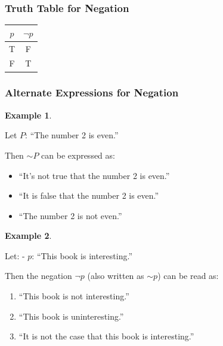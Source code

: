 \documentclass[
]{book}
\providecommand{\tightlist}{%
  \setlength{\itemsep}{0pt}\setlength{\parskip}{0pt}}
\theoremstyle{definition}
\theoremstyle{definition}
\newtheorem{example}{Example}[chapter]
\theoremstyle{definition}
\theoremstyle{definition}
\theoremstyle{remark}
\begin{document}
\subsubsection{Truth Table for Negation}\label{truth-table-for-negation}

\begin{longtable}[]{@{}cc@{}}
\toprule\noalign{}
\(p\) & \(\neg p\) \\
\midrule\noalign{}
\endhead
\bottomrule\noalign{}
\endlastfoot
T & F \\
F & T \\
\end{longtable}

\subsubsection{Alternate Expressions for Negation}\label{alternate-expressions-for-negation}

\begin{example}
\protect\hypertarget{exm:unnamed-chunk-14}{}\label{exm:unnamed-chunk-14}

Let \(P\): ``The number 2 is even.''

Then \(\sim P\) can be expressed as:

\begin{itemize}
\tightlist
\item
  ``It's not true that the number 2 is even.''
\item
  ``It is false that the number 2 is even.''
\item
  ``The number 2 is not even.''
\end{itemize}

\end{example}

\begin{example}
\protect\hypertarget{exm:unnamed-chunk-15}{}\label{exm:unnamed-chunk-15}

Let:
- \(p\): ``This book is interesting.''

Then the negation \(\lnot p\) (also written as \(\sim p\)) can be read as:

\begin{enumerate}
\def\labelenumi{\arabic{enumi}.}
\tightlist
\item
  ``This book is not interesting.''
\item
  ``This book is uninteresting.''
\item
  ``It is not the case that this book is interesting.''
\end{enumerate}

\end{example}
\end{document}
